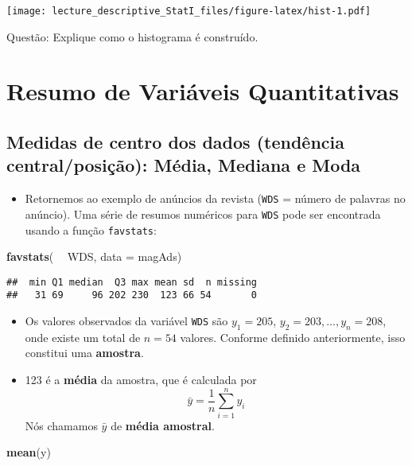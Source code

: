\documentclass[]{article}
\newenvironment{Shaded}{\begin{snugshade}}{\end{snugshade}}
\newcommand{\KeywordTok}[1]{\textcolor[rgb]{0.13,0.29,0.53}{\textbf{#1}}}
\newcommand{\DataTypeTok}[1]{\textcolor[rgb]{0.13,0.29,0.53}{#1}}
\newcommand{\StringTok}[1]{\textcolor[rgb]{0.31,0.60,0.02}{#1}}
\newcommand{\OperatorTok}[1]{\textcolor[rgb]{0.81,0.36,0.00}{\textbf{#1}}}
\newcommand{\NormalTok}[1]{#1}
\providecommand{\tightlist}{%
  \setlength{\itemsep}{0pt}\setlength{\parskip}{0pt}}
\begin{document}
\texttt{[image: lecture\_descriptive\_StatI\_files/figure-latex/hist-1.pdf]}

Questão: Explique como o histograma é construído.

\section{Resumo de Variáveis
Quantitativas}\label{resumo-de-variaveis-quantitativas}

\subsection{Medidas de centro dos dados (tendência central/posição):
Média, Mediana e
Moda}\label{medidas-de-centro-dos-dados-tendencia-centralposicao-media-mediana-e-moda}

\begin{itemize}
\tightlist
\item
  Retornemos ao exemplo de anúncios da revista (\texttt{WDS} = número de
  palavras no anúncio). Uma série de resumos numéricos para \texttt{WDS}
  pode ser encontrada usando a função \texttt{favstats}:
\end{itemize}

\begin{Shaded}
\begin{Highlighting}[]
\KeywordTok{favstats}\NormalTok{( }\OperatorTok{~}\StringTok{ }\NormalTok{WDS, }\DataTypeTok{data =}\NormalTok{ magAds)}
\end{Highlighting}
\end{Shaded}

\begin{verbatim}
##  min Q1 median  Q3 max mean sd  n missing
##   31 69     96 202 230  123 66 54       0
\end{verbatim}

\begin{itemize}
\tightlist
\item
  Os valores observados da variável \texttt{WDS} são \(y_1=205\),
  \(y_2=203,\ldots,y_n=208\), onde existe um total de \(n=54\) valores.
  Conforme definido anteriormente, isso constitui uma \textbf{amostra}.
\item
  123 é a \textbf{média} da amostra, que é calculada por \[
    \bar{y}=\frac{1}{n}\sum_{i=1}^n y_i
  \] Nós chamamos \(\bar{y}\) de \textbf{média amostral}.
\end{itemize}

\begin{Shaded}
\begin{Highlighting}[]
\KeywordTok{mean}\NormalTok{(y)}
\end{Highlighting}
\end{Shaded}
\end{document}
